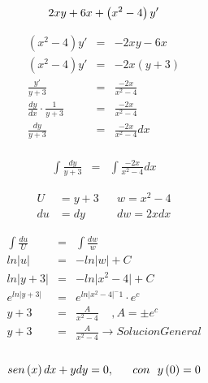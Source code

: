 \documentclass{article}
\begin{document}
\begin{equation}
2xy + 6x + \left(x^2-4 \right) y' \\
\end{equation}

\begin{eqnarray}
\nonumber \left( x^2 -4 \right) y' &=& -2xy-6x\\
\nonumber \left( x^2-4 \right)y' &=& -2x\left( y+3 \right)\\   
\nonumber \frac{y'}{y+3}  &=& \frac{-2x}{x^2-4} \\
\nonumber \frac{dy}{dx} \cdot \frac{1}{y+3} &=&  \frac{-2x}{x^2-4} \\
\nonumber \frac{dy}{y+3}  &=& \frac{-2x}{x^2-4} dx
\end{eqnarray}
\\
\begin{eqnarray}
\nonumber  \int \frac{dy}{y+3}  &=& \int \frac{-2x}{x^2-4} dx
\end{eqnarray}

\begin{align*}
U &= y + 3	&	 &w = x^2-4 \\
du &= dy 	 &	 &dw = 2xdx
\end{align*}

\begin{eqnarray}
\nonumber \int \frac{du}{U} &=& \int \frac{dw}{w} \\
\nonumber ln \lvert u \rvert &=& -ln \lvert w \rvert +C \\
\nonumber ln \lvert y+3 \rvert &=& -ln \lvert x^2-4 \rvert +C \\
\nonumber e^{ln\lvert y+3 \rvert} &=& e^{ln\lvert x^2-4 \rvert ^-1} \cdot e^c \\
\nonumber y+3 &=& \frac{A}{x^2-4}  \ \ \ \ \     , A = \pm e^c \\
\nonumber y+3 &=& \frac{A}{x^2 -4} \rightarrow Solucion General
\end{eqnarray}
\\


\begin{equation}
sen\left( x \right) dx + ydy = 0, \ \ \ \ \ con \ \  y \left(0 \right) = 0 \\
\end{equation}
\end{document}
